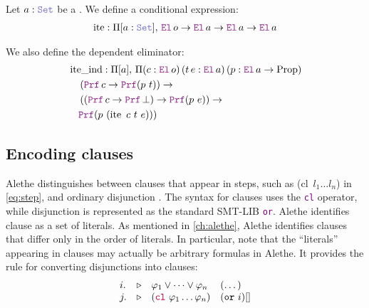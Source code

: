 \begin{definition}
Let \( a: \set \) be a \set. We define a conditional expression:
\begin{align*}
\mathop{\mathrm{ite}} : \Pi [a: \set],\, \el\,o \ra \el\,a \ra \el\,a \ra \el\,a
\end{align*}

We also define the dependent eliminator:
\begin{align*}
&\mathop{\mathrm{ite\_ind}} : \Pi [a],\, \Pi (c : \el\,o)\, (t\, e : \el\,a)\, (p : \el\,a \ra \mathrm{Prop})\\
&\quad\left( \prf\,c \ra \prf(p~t) \right) \ra \\
&\quad\left( (\prf\,c \ra \prf\,\bot) \ra \prf(p~e) \right) \ra \\
&\quad\prf(p~(\mathop{\mathrm{ite}}~c~t~e)))
\end{align*}
\end{definition}

\subsection{Encoding clauses}

Alethe distinguishes between clauses that appear in steps, such as \colorbox{green!30}{(cl~$l_1 \dots l_n$)} in \cref{eq:step}, and ordinary disjunction \cite[\S 4]{alethespec}.
The syntax for clauses uses the \textcolor{purple}{\texttt{cl}} operator, while disjunction is represented as the standard SMT-LIB \textcolor{purple}{\texttt{or}}.
Alethe identifies clause as a set of literals. As mentioned in \cref{ch:alethe}, Alethe identifies clauses that differ only in the order of literals. In particular, note that the ``literals'' appearing in clauses may actually be arbitrary formulas in Alethe.
It provides the  rule for converting disjunctions into clauses:
\[
\begin{matrix*}[l]
  i. & \triangleright & \varphi_1 \lor \dots \lor \varphi_n  & (\dots) \\
  j. & \triangleright & (\texttt{\textcolor{purple}{cl}}~\varphi_1 \dots \varphi_n)  & (\kw{or}~i)[] \\
\end{matrix*}
\]


